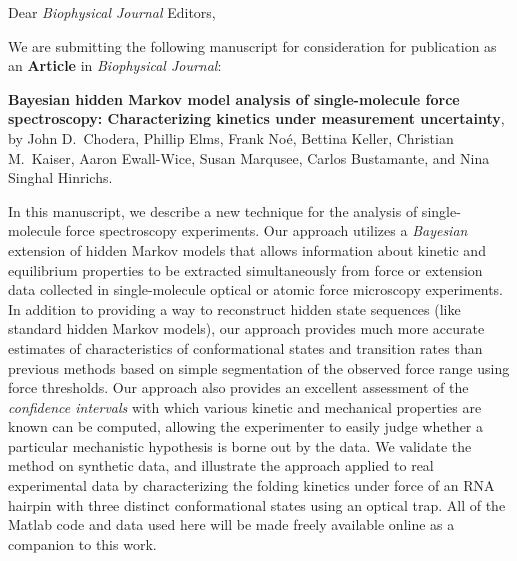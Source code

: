 \documentclass[ucb,qb3,10pt,fullfrom]{ucletter}
\date{\today}
\begin{document}
\begin{letter}{}
\opening{Dear \emph{Biophysical Journal} Editors,}

We are submitting the following manuscript for consideration for publication as an {\bf Article} in \emph{Biophysical Journal}:

{\bf Bayesian hidden Markov model analysis of single-molecule force spectroscopy: Characterizing kinetics under measurement uncertainty}, by John D.~Chodera, Phillip Elms, Frank No\'{e}, Bettina Keller, Christian M.~Kaiser, Aaron Ewall-Wice,  Susan Marqusee, Carlos Bustamante, and Nina Singhal Hinrichs.

In this manuscript, we describe a new technique for the analysis of single-molecule force spectroscopy experiments.
Our approach utilizes a \emph{Bayesian} extension of hidden Markov models that allows information about kinetic and equilibrium properties to be extracted simultaneously from force or extension data collected in single-molecule optical or atomic force microscopy experiments.
In addition to providing a way to reconstruct hidden state sequences (like standard hidden Markov models), our approach provides much more accurate estimates of characteristics of conformational states and transition rates than previous methods based on simple segmentation of the observed force range using force thresholds.
Our approach also provides an excellent assessment of the \emph{confidence intervals} with which various kinetic and mechanical properties are known can be computed, allowing the experimenter to easily judge whether a particular mechanistic hypothesis is borne out by the data.
We validate the method on synthetic data, and illustrate the approach applied to real experimental data by characterizing the folding kinetics under force of an RNA hairpin with three distinct conformational states using an optical trap.
All of the Matlab code and data used here will be made freely available online as a companion to this work.


\end{letter}
\end{document}

